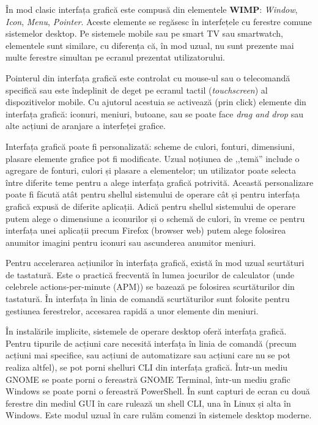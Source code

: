 În mod clasic interfața grafică este compusă din elementele \textbf{WIMP}: \textit{Window}, \textit{Icon}, \textit{Menu}, \textit{Pointer}. Aceste elemente se regăsesc în interfețele cu ferestre comune sistemelor desktop. Pe sistemele mobile sau pe smart TV sau smartwatch, elementele sunt similare, cu diferența că, în mod uzual, nu sunt prezente mai multe ferestre simultan pe ecranul prezentat utilizatorului.

Pointerul din interfața grafică este controlat cu mouse-ul sau o telecomandă specifică sau este îndeplinit de deget pe ecranul tactil (\textit{touchscreen}) al dispozitivelor mobile. Cu ajutorul acestuia se activează (prin click) elemente din interfața grafică: iconuri, meniuri, butoane, sau se poate face \textit{drag and drop} sau alte acțiuni de aranjare a interfeței grafice.

Interfața grafică poate fi personalizată: scheme de culori, fonturi, dimensiuni, plasare elemente grafice pot fi modificate. Uzual noțiunea de ,,temă'' include o agregare de fonturi, culori și plasare a elementelor; un utilizator poate selecta între diferite teme pentru a alege interfața grafică potrivită. Această personalizare poate fi făcută atât pentru shellul sistemului de operare cât și pentru interfața grafică expusă de diferite aplicații. Adică pentru shellul sistemului de operare putem alege o dimensiune a iconurilor și o schemă de culori, în vreme ce pentru interfața unei aplicații precum Firefox (browser web) putem alege folosirea anumitor imagini pentru iconuri sau ascunderea anumitor meniuri.

Pentru accelerarea acțiunilor în interfața grafică, există în mod uzual scurtături de tastatură. Este o practică frecventă în lumea jocurilor de calculator (unde celebrele actions-per-minute (APM)) se bazează pe folosirea scurtăturilor din tastatură. În interfața în linia de comandă scurtăturilor sunt folosite pentru gestiunea ferestrelor, accesarea rapidă a unor elemente din meniuri.

În instalările implicite, sistemele de operare desktop oferă interfața grafică. Pentru tipurile de acțiuni care necesită interfața în linia de comandă (precum acțiuni mai specifice, sau acțiuni de automatizare sau acțiuni care nu se pot realiza altfel), se pot porni shelluri CLI din interfața grafică. Într-un mediu GNOME se poate porni o fereastră GNOME Terminal, într-un mediu grafic Windows se poate porni o fereastră PowerShell. În  sunt capturi de ecran cu două ferestre din mediul GUI în care rulează un shell CLI, una în Linux și alta în Windows. Este modul uzual în care rulăm comenzi în sistemele desktop moderne.

